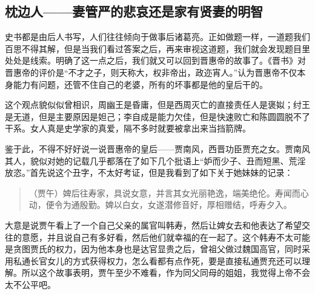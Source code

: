 \documentclass[]{book}
\begin{document}
\hypertarget{ux6795ux8fb9ux4ebaux59bbux7ba1ux4e25ux7684ux60b2ux54c0ux8fd8ux662fux5bb6ux6709ux8d24ux59bbux7684ux660eux667a}{%
\subsection{枕边人------妻管严的悲哀还是家有贤妻的明智}\label{ux6795ux8fb9ux4ebaux59bbux7ba1ux4e25ux7684ux60b2ux54c0ux8fd8ux662fux5bb6ux6709ux8d24ux59bbux7684ux660eux667a}}

史书都是由后人书写，人们往往倾向于做事后诸葛亮。正如做题一样，一道题我们百思不得其解，但是当我们看过答案之后，再来审视这道题，我们就会发现题目里处处是线索。明确了这一点之后，我们就又可以回到晋惠帝的故事了。《晋书》对晋惠帝的评价是``不才之子，则天称大，权非帝出，政迩宵人。''认为晋惠帝不仅本身能力有问题，还管不住自己的老婆，所有的坏事都是他的皇后干的。

这个观点貌似似曾相识，周幽王是昏庸，但是西周灭亡的直接责任人是褒姒；纣王是无道，但是主要原因是妲己；李自成是能力欠佳，但是快速败亡和陈圆圆脱不了干系。女人真是史学家的真爱，隔不多时就要被拿出来当挡箭牌。

鉴于此，不得不好好说一说晋惠帝的皇后------贾南风，西晋功臣贾充之女。贾南风其人，貌似对她的记载几乎都落在了如下几个批语上``妒而少子、丑而短黑、荒淫放恣。''首先说这个丑字，不太好考证，但是我看到了如下关于她妹妹的记录：

\begin{quote}
（贾午）婢后往寿家，具说女意，并言其女光丽艳逸，端美绝伦。寿闻而心动，便令为通殷勤。婢以白女，女遂潜修音好，厚相赠结，呼寿夕入。
\end{quote}

大意是说贾午看上了一个自己父亲的属官叫韩寿，然后让婢女去和他表达了希望交往的意愿，并且说自己有多好看，然后他们就幸福的在一起了。这个韩寿不太可能是贪图贾氏的权力，因为他本身也是达官显贵之后，曾祖父做过魏国高官，同时采用私通长官女儿的方式获得权力，怎么看都有点作死，要是直接私通贾充还可以理解。所以这个故事表明，贾午至少不难看，作为同父同母的姐姐，我觉得上帝不会太不公平吧。
\end{document}
